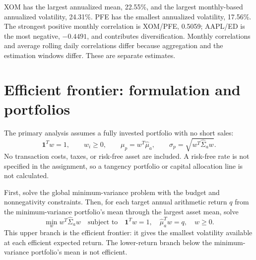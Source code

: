 \documentclass[10pt,letterpaper]{article}
\newcommand{\ones}{\mathbf{1}}
\begin{document}
\begin{table}[H]
\centering
\caption{Monthly statistics and annualized inputs from 24 monthly returns (percent).}
\label{tab:monthly}
\small
\end{table}

\begin{table}[H]
\centering
\caption{Monthly return correlation matrix (dimensionless).}
\label{tab:monthly-corr}
\small
\end{table}

\begin{table}[H]
\centering
\caption{Monthly sample covariance matrix (squared decimal-return units, not percent). Annualized covariance is this matrix multiplied by 12.}
\label{tab:monthly-cov}
\small
\end{table}

XOM has the largest annualized mean, 22.55\%, and the largest monthly-based
annualized volatility, 24.31\%. PFE has the smallest annualized volatility,
17.56\%. The strongest positive monthly correlation is XOM/PFE, 0.5059;
AAPL/ED is the most negative, $-0.4491$, and contributes diversification.
Monthly correlations and average rolling daily correlations differ because
aggregation and the estimation windows differ. These are separate estimates.

\clearpage
\section{Efficient frontier: formulation and portfolios}
The primary analysis assumes a fully invested portfolio with no short sales:
\begin{equation}
 \ones^T w=1,\qquad w_i\geq 0,\qquad
 \mu_p=w^T\widehat\mu_a,\qquad
 \sigma_p=\sqrt{w^T\widehat\Sigma_a w}.
 \label{eq:portfolio}
\end{equation}
No transaction costs, taxes, or risk-free asset are included. A risk-free
rate is not specified in the assignment, so a tangency portfolio or capital
allocation line is not calculated.

First, solve the global minimum-variance problem with the budget and
nonnegativity constraints. Then, for each target annual arithmetic return $q$
from the minimum-variance portfolio's mean through the largest asset mean,
solve
\begin{equation}
 \min_w w^T\widehat\Sigma_a w
 \quad\text{subject to}\quad
 \ones^T w=1,\quad \widehat\mu_a^T w=q,\quad w\geq 0.
 \label{eq:frontier}
\end{equation}
This upper branch is the efficient frontier: it gives the smallest volatility
available at each efficient expected return. The lower-return branch below
the minimum-variance portfolio's mean is not efficient.
\end{document}
